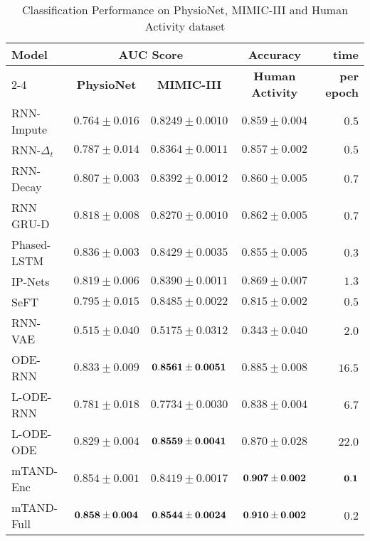 \begin{table}[t]
\centering
\footnotesize
    \caption{Classification Performance on PhysioNet, MIMIC-III and Human Activity dataset}
    \label{table:classif}
     \begin{tabular}[h]{l c c c r}
        \toprule
        \multirow{2}{*}{\bf Model} & \multicolumn{2}{c}{\bf AUC Score} & {\bf Accuracy} & \multirow{2}{*}{\bf time}\\
        \cmidrule{2-4}
        & {\bf PhysioNet} & {\bf MIMIC-III} & {\bf Human Activity} & {\bf per epoch}\\
        \midrule
        RNN-Impute	    & $	0.764	\pm	0.016	$ & $0.8249 \pm 0.0010$ & $	0.859	\pm	0.004	$ & $ 0.5$\\
        RNN-$\Delta_t$	& $	0.787	\pm	0.014	$ & $0.8364 \pm 0.0011$ & $	0.857	\pm	0.002	$ & $ 0.5$\\
        RNN-Decay	    & $	0.807	\pm	0.003	$ & $0.8392 \pm 0.0012$ & $	0.860	\pm	0.005	$ & $ 0.7$\\
        RNN GRU-D	    & $	0.818	\pm	0.008	$ & $0.8270 \pm 0.0010$ & $	0.862	\pm	0.005	$ & $ 0.7$\\
        Phased-LSTM     & $ 0.836   \pm 0.003   $ & $0.8429 \pm 0.0035$ & $ 0.855   \pm 0.005   $ & $ 0.3$\\    
        IP-Nets	        & $	0.819	\pm	0.006	$ & $0.8390 \pm 0.0011$ & $ 0.869   \pm 0.007   $ & $ 1.3$\\
        SeFT	        & $	0.795	\pm	0.015	$ & $0.8485 \pm 0.0022$ & $ 0.815   \pm 0.002$ & $ 0.5 $\\
        RNN-VAE	        & $	0.515	\pm	0.040	$ & $0.5175 \pm 0.0312$ & $	0.343	\pm	0.040	$ & $ 2.0$\\
        ODE-RNN	        & $	0.833	\pm	0.009	$ & $\bf{0.8561}\pm \bf{0.0051}	$ & $	0.885	\pm	0.008	$ & $ 16.5$\\
        L-ODE-RNN 	    & $	0.781	\pm	0.018	$ & $0.7734	\pm	0.0030$ & $	0.838	\pm	0.004	$ & $ 6.7$\\
        L-ODE-ODE	    & $	0.829	\pm	0.004	$ & $\bf{0.8559}\pm	\bf{0.0041}	$ & $	0.870	\pm	0.028	$ & $ 22.0$\\
        \midrule 
        {mTAND-Enc}	& $	{0.854	\pm	0.001}	$ & $0.8419 \pm 0.0017$ & $	\bf{0.907 \pm 0.002}$ & $ \bf{0.1}$\\
        {mTAND-Full}& $	\bf{0.858	\pm	0.004}	$ & $\bf{0.8544} \pm \bf{0.0024}$ & $   \bf{0.910 \pm 0.002}$ & $ 0.2$\\
        \bottomrule
    \end{tabular}
\end{table}



